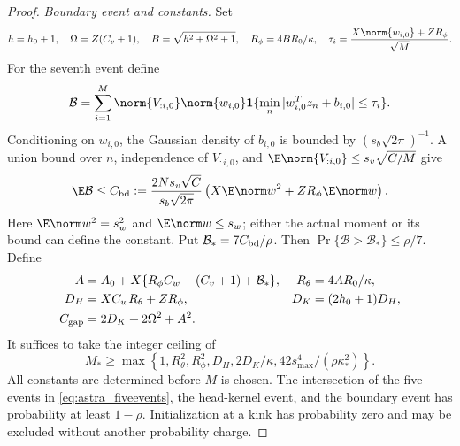 \begin{proof}
\emph{Boundary event and constants.}
Set
\[
 h=h_0+1,\quad \Omega=Z(C_v+1),\quad
 B=\sqrt{h^2+\Omega^2+1},\quad R_\phi=4BR_0/\kappa,
 \quad \tau_i=\frac{X\norm{w_{i,0}}+ZR_\phi}{\sqrt M}.
\]
For the seventh event define
\[
 \mathcal B=\sum_{i=1}^M\norm{V_{:i,0}}\norm{w_{i,0}}
 \mathbf1\{\min_n|w_{i,0}^Tz_n+b_{i,0}|\le\tau_i\}.
\]
Conditioning on $w_{i,0}$, the Gaussian density of $b_{i,0}$ is bounded
by $(s_b\sqrt{2\pi})^{-1}$. A union bound over $n$, independence
of $V_{:i,0}$, and $\E\norm{V_{:i,0}}\le s_v\sqrt{C/M}$ give
\[
 \E\mathcal B\le C_{\rm bd}
 :=\frac{2Ns_v\sqrt C}{s_b\sqrt{2\pi}}
 \left(X\E\norm w^2+ZR_\phi\E\norm w\right).
\]
Here $\E\norm w^2=s_w^2$ and $\E\norm w\le s_w$; either the actual
moment or its bound can define the constant. Put
$\mathcal B_*=7C_{\rm bd}/\rho$. Then
$\Pr\{\mathcal B>\mathcal B_*\}\le\rho/7$.
Define
\begin{align*}
 A&=A_0+X\{R_\phi C_w+(C_v+1)+\mathcal B_*\},&
 R_\theta&=4AR_0/\kappa,\\
 D_H&=XC_wR_\theta+ZR_\phi,&
 D_K&=(2h_0+1)D_H,\\
 C_{\rm gap}&=2D_K+2\Omega^2+A^2.
\end{align*}
It suffices to take the integer ceiling of
\begin{equation}\label{eq:astra_widththreshold}
 M_*\ge\max\left\{1,R_\theta^2,R_\phi^2,D_H,
              2D_K/\kappa,42s_{\max}^4/(\rho\kappa_*^2)\right\}.
\end{equation}
All constants are determined before $M$ is chosen. The intersection
of the five events in \eqref{eq:astra_fiveevents}, the head-kernel
event, and the boundary event has probability at least $1-\rho$.
Initialization at a kink has probability zero and may be excluded
without another probability charge.


\end{proof}
